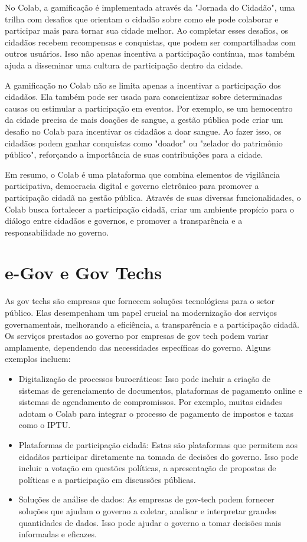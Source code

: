 No Colab, a gamificação é implementada através da "Jornada do Cidadão", uma trilha com desafios que orientam o cidadão sobre como ele pode colaborar e participar mais para tornar sua cidade melhor. Ao completar esses desafios, os cidadãos recebem recompensas e conquistas, que podem ser compartilhadas com outros usuários. Isso não apenas incentiva a participação contínua, mas também ajuda a disseminar uma cultura de participação dentro da cidade.

A gamificação no Colab não se limita apenas a incentivar a participação dos cidadãos. Ela também pode ser usada para conscientizar sobre determinadas causas ou estimular a participação em eventos. Por exemplo, se um hemocentro da cidade precisa de mais doações de sangue, a gestão pública pode criar um desafio no Colab para incentivar os cidadãos a doar sangue. Ao fazer isso, os cidadãos podem ganhar conquistas como "doador" ou "zelador do patrimônio público", reforçando a importância de suas contribuições para a cidade.

Em resumo, o Colab é uma plataforma que combina elementos de vigilância participativa, democracia digital e governo eletrônico para promover a participação cidadã na gestão pública. Através de suas diversas funcionalidades, o Colab busca fortalecer a participação cidadã, criar um ambiente propício para o diálogo entre cidadãos e governos, e promover a transparência e a responsabilidade no governo.

\section*{e-Gov e Gov Techs}
As gov techs são empresas que fornecem soluções tecnológicas para o setor público. Elas desempenham um papel crucial na modernização dos serviços governamentais, melhorando a eficiência, a transparência e a participação cidadã. Os serviços prestados ao governo por empresas de gov tech podem variar amplamente, dependendo das necessidades específicas do governo. Alguns exemplos incluem:

\begin{itemize}
	\item Digitalização de processos burocráticos: Isso pode incluir a criação de sistemas de gerenciamento de documentos, plataformas de pagamento online e sistemas de agendamento de compromissos. Por exemplo, muitas cidades adotam o Colab para integrar o processo de pagamento de impostos e taxas como o IPTU.
	\item Plataformas de participação cidadã: Estas são plataformas que permitem aos cidadãos participar diretamente na tomada de decisões do governo. Isso pode incluir a votação em questões políticas, a apresentação de propostas de políticas e a participação em discussões públicas.
	\item Soluções de análise de dados: As empresas de gov-tech podem fornecer soluções que ajudam o governo a coletar, analisar e interpretar grandes quantidades de dados. Isso pode ajudar o governo a tomar decisões mais informadas e eficazes.
\end{itemize}

